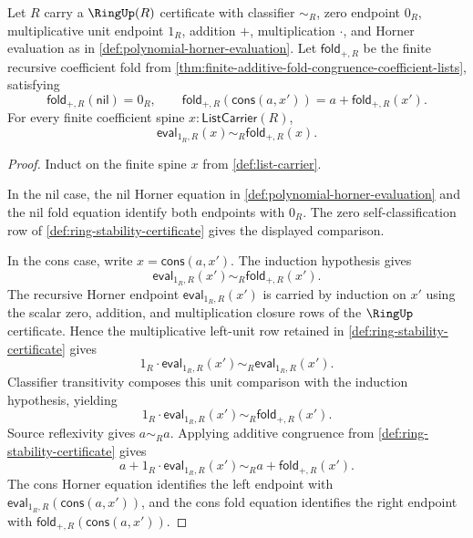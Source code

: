 \begin{lemma}
\label{lem:unit-point-horner-evaluation-coefficient-fold}
Let $R$ carry a $\RingUp(R)$ certificate with classifier $\sim_R$, zero endpoint $0_R$, multiplicative unit endpoint $1_R$, addition $+$, multiplication $\cdot$, and Horner evaluation as in \autoref{def:polynomial-horner-evaluation}. Let $\mathsf{fold}_{+,R}$ be the finite recursive coefficient fold from \autoref{thm:finite-additive-fold-congruence-coefficient-lists}, satisfying
$$
\mathsf{fold}_{+,R}(\mathsf{nil})=0_R,
\qquad
\mathsf{fold}_{+,R}(\mathsf{cons}(a,x'))=a+\mathsf{fold}_{+,R}(x').
$$
For every finite coefficient spine $x:\mathsf{ListCarrier}(R)$,
$$
\mathsf{eval}_{1_R,R}(x)\sim_R\mathsf{fold}_{+,R}(x).
$$
\end{lemma}
\begin{proof}
Induct on the finite spine $x$ from \autoref{def:list-carrier}.

In the nil case, the nil Horner equation in \autoref{def:polynomial-horner-evaluation} and the nil fold equation identify both endpoints with $0_R$. The zero self-classification row of \autoref{def:ring-stability-certificate} gives the displayed comparison.

In the cons case, write $x=\mathsf{cons}(a,x')$. The induction hypothesis gives
$$
\mathsf{eval}_{1_R,R}(x')\sim_R\mathsf{fold}_{+,R}(x').
$$
The recursive Horner endpoint $\mathsf{eval}_{1_R,R}(x')$ is carried by induction on $x'$ using the scalar zero, addition, and multiplication closure rows of the $\RingUp$ certificate. Hence the multiplicative left-unit row retained in \autoref{def:ring-stability-certificate} gives
$$
1_R\cdot\mathsf{eval}_{1_R,R}(x')\sim_R\mathsf{eval}_{1_R,R}(x').
$$
Classifier transitivity composes this unit comparison with the induction hypothesis, yielding
$$
1_R\cdot\mathsf{eval}_{1_R,R}(x')\sim_R\mathsf{fold}_{+,R}(x').
$$
Source reflexivity gives $a\sim_Ra$. Applying additive congruence from \autoref{def:ring-stability-certificate} gives
$$
a+1_R\cdot\mathsf{eval}_{1_R,R}(x')\sim_Ra+\mathsf{fold}_{+,R}(x').
$$
The cons Horner equation identifies the left endpoint with $\mathsf{eval}_{1_R,R}(\mathsf{cons}(a,x'))$, and the cons fold equation identifies the right endpoint with $\mathsf{fold}_{+,R}(\mathsf{cons}(a,x'))$.
\end{proof}

